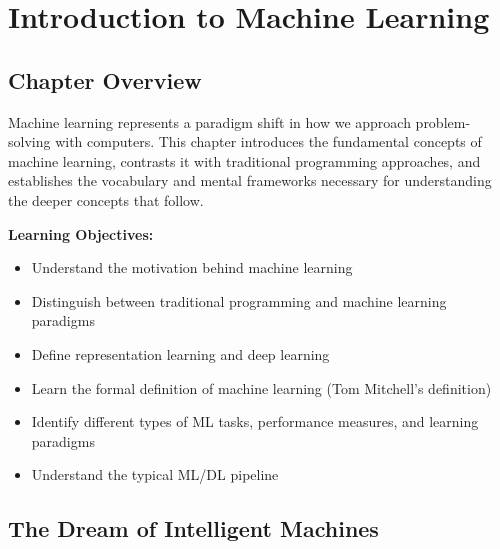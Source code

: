 
\chapter{Introduction to Machine Learning}
\label{ch:introduction}


\section{Chapter Overview}

Machine learning represents a paradigm shift in how we approach problem-solving with computers. This chapter introduces the fundamental concepts of machine learning, contrasts it with traditional programming approaches, and establishes the vocabulary and mental frameworks necessary for understanding the deeper concepts that follow.

\textbf{Learning Objectives:}
\begin{itemize}
    \item Understand the motivation behind machine learning
    \item Distinguish between traditional programming and machine learning paradigms
    \item Define representation learning and deep learning
    \item Learn the formal definition of machine learning (Tom Mitchell's definition)
    \item Identify different types of ML tasks, performance measures, and learning paradigms
    \item Understand the typical ML/DL pipeline
\end{itemize}


\section{The Dream of Intelligent Machines}

